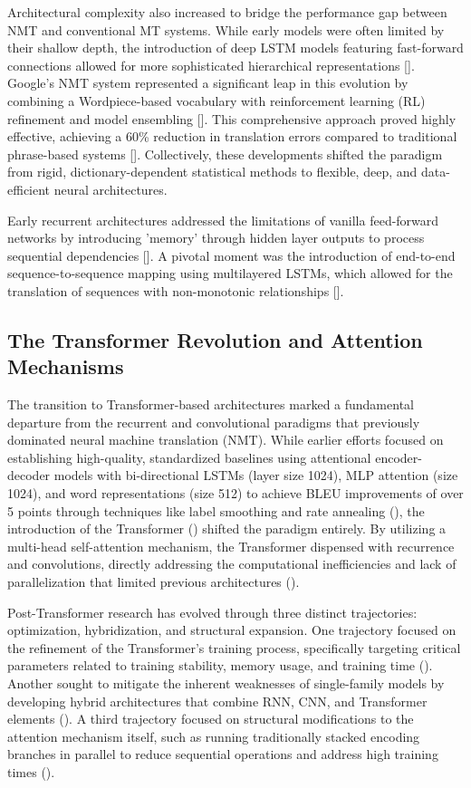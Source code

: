 \documentclass[11pt]{article}
\begin{document}
Architectural complexity also increased to bridge the performance gap between NMT and conventional MT systems. While early models were often limited by their shallow depth, the introduction of deep LSTM models featuring fast-forward connections allowed for more sophisticated hierarchical representations [\citep{1606.04199}]. Google's NMT system represented a significant leap in this evolution by combining a Wordpiece-based vocabulary with reinforcement learning (RL) refinement and model ensembling [\citep{1609.08144}]. This comprehensive approach proved highly effective, achieving a 60\% reduction in translation errors compared to traditional phrase-based systems [\citep{1609.08144}]. Collectively, these developments shifted the paradigm from rigid, dictionary-dependent statistical methods to flexible, deep, and data-efficient neural architectures.

Early recurrent architectures addressed the limitations of vanilla feed-forward networks by introducing 'memory' through hidden layer outputs to process sequential dependencies [\citep{2004.04902}]. A pivotal moment was the introduction of end-to-end sequence-to-sequence mapping using multilayered LSTMs, which allowed for the translation of sequences with non-monotonic relationships [\citep{1409.3215}].
\subsection{The Transformer Revolution and Attention Mechanisms}

The transition to Transformer-based architectures marked a fundamental departure from the recurrent and convolutional paradigms that previously dominated neural machine translation (NMT). While earlier efforts focused on establishing high-quality, standardized baselines using attentional encoder-decoder models with bi-directional LSTMs (layer size 1024), MLP attention (size 1024), and word representations (size 512) to achieve BLEU improvements of over 5 points through techniques like label smoothing and rate annealing (\citep{1706.09733}), the introduction of the Transformer (\citep{1706.03762}) shifted the paradigm entirely. By utilizing a multi-head self-attention mechanism, the Transformer dispensed with recurrence and convolutions, directly addressing the computational inefficiencies and lack of parallelization that limited previous architectures (\citep{1706.03762}).

Post-Transformer research has evolved through three distinct trajectories: optimization, hybridization, and structural expansion. One trajectory focused on the refinement of the Transformer's training process, specifically targeting critical parameters related to training stability, memory usage, and training time (\citep{1804.00247}). Another sought to mitigate the inherent weaknesses of single-family models by developing hybrid architectures that combine RNN, CNN, and Transformer elements (\citep{1804.09849}). A third trajectory focused on structural modifications to the attention mechanism itself, such as running traditionally stacked encoding branches in parallel to reduce sequential operations and address high training times (\citep{1810.12427}).
\end{document}
